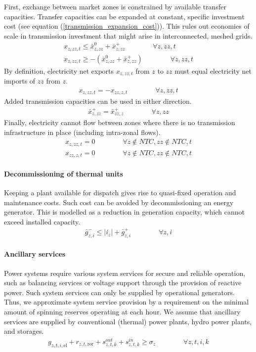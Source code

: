 \documentclass[11pt,a4paper]{article}
\begin{document}
First, exchange between market zones is constrained by available transfer capacities. Transfer capacities can be expanded at constant, specific investment cost (see equation (\ref{transmission_expansion_cost})). This rules out economies of scale in transmission investment that might arise in interconnected, meshed grids.
\begin{align}
x_{z,zz,t} \leq \bar{x}^{0}_{z,zz} + \bar{x}^{+}_{z,zz} \qquad \qquad \forall z, zz, t \\
x_{z,zz,t} \geq - \left( \bar{x}^{0}_{z,zz} + \bar{x}^{+}_{z,zz} \right) \qquad \qquad \forall z, zz, t
\end{align}
By definition, electricity net exports $x_{z,zz,t}$ from $z$ to $zz$ must equal electricity net imports of $zz$ from $z$.
\begin{align}
x_{z,zz,t} = -x_{zz,z,t} \qquad \qquad \forall z, zz, t
\end{align}
Added transmission capacities can be used in either direction.
\begin{align}
\bar{x}^{+}_{z,zz} = \bar{x}^{+}_{zz,z} \qquad \qquad \forall z, zz
\end{align}
Finally, electricity cannot flow between zones where there is no transmission infrastructure in place (including intra-zonal flows).
\begin{align}
x_{z,zz,t} = 0 \qquad \qquad \forall z \notin NTC, zz \notin NTC, t \\
x_{zz,z,t} = 0 \qquad \qquad \forall z \notin NTC, zz \notin NTC, t
\end{align}

\paragraph{Decommissioning of thermal units}
Keeping a plant available for dispatch gives rise to quasi-fixed operation and maintenance costs. 
Such cost can be avoided by decommissioning an energy generator. This is modelled as a reduction in generation capacity, which cannot exceed installed capacity.
\begin{align}
\bar{g}^{-}_{z,i} \leq |i_{z}| + \bar{g}^{+}_{z,i} \qquad \qquad \forall z,i
\end{align}

\paragraph{Ancillary services}
Power systems require various system services for secure and reliable operation, such as balancing services or voltage support through the provision of reactive power. Such system services can only be supplied by operational generators. Thus, we approximate system service provision by a requirement on the minimal amount of spinning reserves operating at each hour. 
We assume that ancillary services are supplied by conventional (thermal) power plants, hydro power plants, and storages.
\begin{align}
g_{z,t,i,\text{el}} + r_{z,t,\text{ror}} + s^{out}_{z,t,k} + s^{in}_{z,t,k} \geq \sigma_{z} \qquad \qquad \forall z,t,i,k
\end{align}
\end{document}
